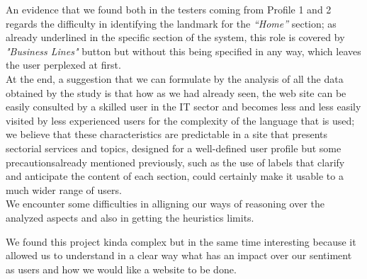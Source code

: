 An evidence that we found both in the testers coming from Profile 1 and 2 regards the difficulty in identifying the landmark for the \textit{“Home”} section; as already underlined in the specific section of the system, this role is covered by \textit{"Business Lines"} button but without this being specified in any way, which leaves the user perplexed at first.\\
At the end, a suggestion that we can formulate by the analysis of all the data obtained by the study is that how as we had already seen, the web site can be easily consulted by a skilled user in the IT sector and becomes less and less easily visited by less experienced users for the complexity of the language that is used; we believe that these characteristics are predictable in a site that presents sectorial services and topics, designed for a well-defined user profile but some precautionsalready mentioned previously, such as the use of labels that clarify and anticipate the content of each section, could certainly make it usable to a much wider range of users.\\
We encounter some difficulties in alligning our ways of reasoning over the analyzed aspects and also in getting the heuristics limits.\par 
We found this project kinda complex but in the same time interesting because it allowed us to understand in a clear way what has an impact over our sentiment as users and how we would like a website to be done.
